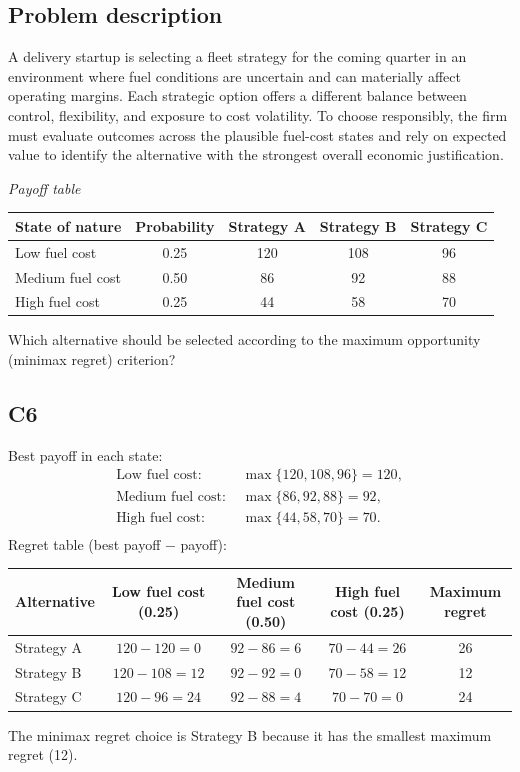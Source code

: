 \begin{ExamProblems}
		\subsection*{Problem description}
		A delivery startup is selecting a fleet strategy for the coming quarter in an environment where fuel conditions are uncertain and can materially affect operating margins. Each strategic option offers a different balance between control, flexibility, and exposure to cost volatility. To choose responsibly, the firm must evaluate outcomes across the plausible fuel-cost states and rely on expected value to identify the alternative with the strongest overall economic justification.

		\begin{center}
			\textit{Payoff table} \par
			\begin{tabular}{l c c c c}
				\toprule
				State of nature & Probability & Strategy A & Strategy B & Strategy C \\
				\midrule
				Low fuel cost & 0.25 & 120 & 108 & 96 \\
				Medium fuel cost & 0.50 & 86 & 92 & 88 \\
				High fuel cost & 0.25 & 44 & 58 & 70 \\
				\bottomrule
			\end{tabular}
		\end{center}

		Which alternative should be selected according to the maximum opportunity (minimax regret) criterion?

		\subsection*{C6}
		Best payoff in each state:
		\[
		\begin{aligned}
			\text{Low fuel cost: } &\max\{120, 108, 96\} = 120, \\
			\text{Medium fuel cost: } &\max\{86, 92, 88\} = 92, \\
			\text{High fuel cost: } &\max\{44, 58, 70\} = 70. \\
		\end{aligned}
		\]
		Regret table (best payoff $-$ payoff):
		\begin{center}
			\begin{tabular}{l c c c c}
				\toprule
				Alternative & Low fuel cost (0.25) & Medium fuel cost (0.50) & High fuel cost (0.25) & Maximum regret \\
				\midrule
				Strategy A & $120-120=0$ & $92-86=6$ & $70-44=26$ & 26 \\
				Strategy B & $120-108=12$ & $92-92=0$ & $70-58=12$ & 12 \\
				Strategy C & $120-96=24$ & $92-88=4$ & $70-70=0$ & 24 \\
				\bottomrule
			\end{tabular}
		\end{center}
		The minimax regret choice is Strategy B because it has the smallest maximum regret (12).
		\item

\end{ExamProblems}
